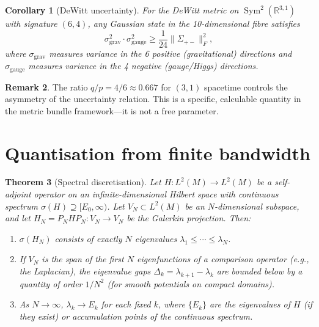 \documentclass[12pt,a4paper]{article}
\newtheorem{theorem}{Theorem}[section]
\newtheorem{corollary}[theorem]{Corollary}
\theoremstyle{definition}
\newtheorem{remark}[theorem]{Remark}
\newcommand{\Sym}{\operatorname{Sym}}
\newcommand{\R}{\mathbb{R}}
\begin{document}
\begin{corollary}[DeWitt uncertainty]
  \label{cor:dewitt-uncertainty}
  For the DeWitt metric on $\Sym^2(\R^{3,1})$ with signature $(6,4)$,
  any Gaussian state in the 10-dimensional fibre satisfies
  \begin{equation}
    \sigma_{\mathrm{grav}}^2 \cdot \sigma_{\mathrm{gauge}}^2
    \geq \frac{1}{24}\|\Sigma_{+-}\|_F^2,
  \end{equation}
  where $\sigma_{\mathrm{grav}}$ measures variance in the 6 positive
  (gravitational) directions and $\sigma_{\mathrm{gauge}}$ measures
  variance in the 4 negative (gauge/Higgs) directions.
\end{corollary}

\begin{remark}
  The ratio $q/p = 4/6 \approx 0.667$ for $(3,1)$ spacetime controls
  the asymmetry of the uncertainty relation. This is a specific,
  calculable quantity in the metric bundle framework---it is not a free
  parameter.
\end{remark}

\section{Quantisation from finite bandwidth}
\label{sec:quantisation}

\begin{theorem}[Spectral discretisation]
  \label{thm:quantisation}
  Let $H : L^2(M) \to L^2(M)$ be a self-adjoint operator on an
  infinite-dimensional Hilbert space with continuous spectrum
  $\sigma(H) \supseteq [E_0, \infty)$. Let $V_N \subset L^2(M)$ be
  an $N$-dimensional subspace, and let
  $H_N = P_N H P_N : V_N \to V_N$ be the Galerkin projection. Then:
  \begin{enumerate}[label=(\alph*)]
    \item $\sigma(H_N)$ consists of exactly $N$ eigenvalues
      $\lambda_1 \leq \cdots \leq \lambda_N$.
    \item If $V_N$ is the span of the first $N$ eigenfunctions of
      a comparison operator (e.g., the Laplacian), the eigenvalue gaps
      $\Delta_k = \lambda_{k+1} - \lambda_k$ are bounded below by
      a quantity of order $1/N^2$ (for smooth potentials on compact
      domains).
    \item As $N \to \infty$, $\lambda_k \to E_k$ for each fixed $k$,
      where $\{E_k\}$ are the eigenvalues of $H$ (if they exist) or
      accumulation points of the continuous spectrum.
  \end{enumerate}
\end{theorem}
\end{document}
